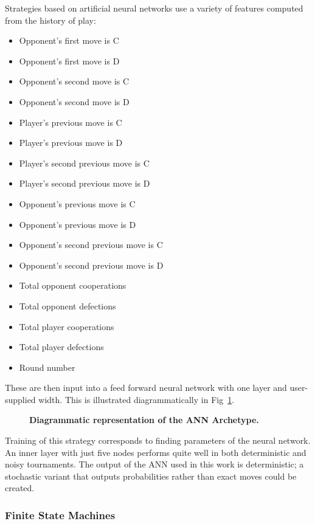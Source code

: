 \documentclass[10pt,letterpaper]{article}
\begin{document}
Strategies based on artificial neural networks use a variety of features
computed from the history of play:

\begin{itemize}
    \item Opponent's first move is C
    \item Opponent's first move is D
    \item Opponent's second move is C
    \item Opponent's second move is D
    \item Player's previous move is C
    \item Player's previous move is D
    \item Player's second previous move is C
    \item Player's second previous move is D
    \item Opponent's previous move is C
    \item Opponent's previous move is D
    \item Opponent's second previous move is C
    \item Opponent's second previous move is D
    \item Total opponent cooperations
    \item Total opponent defections
    \item Total player cooperations
    \item Total player defections
    \item Round number
\end{itemize}

These are then input into a feed forward neural network with one layer and
user-supplied width. This is illustrated diagrammatically in
Fig~\ref{fig:ann}.

\begin{figure}[!hbtp]
    \centering
    \caption{\bf Diagrammatic representation of the ANN Archetype.}
    \label{fig:ann}
\end{figure}

Training of this strategy corresponds to finding parameters of the neural
network. An inner layer with just five nodes performs quite well in both deterministic and
noisy tournaments. The output of the ANN used in this work is deterministic;
a stochastic variant that outputs probabilities rather than exact moves could
be created.

\subsubsection*{Finite State Machines}\label{sec:fsm}
\end{document}
